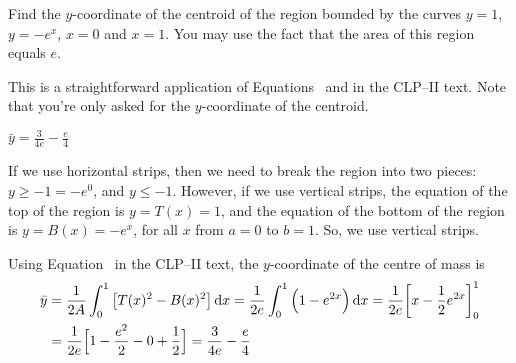 
\begin{question}[2012A]
Find the $y$-coordinate of the centroid of the region bounded by the
curves $y=1$, $y=-e^x$, $x=0$ and $x=1$. You may use the fact that the area
of this region equals $e$.
\end{question}

\begin{hint}
This is a straightforward application of Equations~ and   in the
CLP--II text. Note that you're only asked for the $y$-coordinate of the centroid.
\end{hint}

\begin{answer}
$\displaystyle\bar y = \frac{3}{4e}-\frac{e}{4}$
\end{answer}

\begin{solution}
If we use horizontal strips, then we need to break the region into two pieces: $y \geq -1=-e^0$, and $y \leq -1$. However, if we use vertical strips,
the equation of the top of the region is $y=T(x)=1$, and the equation of the
bottom of the region is $y=B(x)=-e^x$, for all $x$  from $a=0$ to $b=1$. So, we use vertical strips.

\begin{center}
\end{center}

Using Equation~ in the CLP--II text, the $y$-coordinate of the centre of mass is
\begin{align*}
\bar y & = \frac{1}{2A}\int_0^1  \big[T(x)^2-B(x)^2\big]\,\mathrm{d}x
= \frac{1}{2e}\int_0^1 \Big(1-e^{2x} \Big) \,\mathrm{d}x
= \frac{1}{2e}\bigg[x-\frac{1}{2}e^{2x}\bigg]_0^1 \\
&= \frac{1}{2e}\Big[1-\frac{e^2}{2} -0 + \frac{1}{2}\Big]
=\frac{3}{4e}-\frac{e}{4}
\end{align*}

\end{solution}


